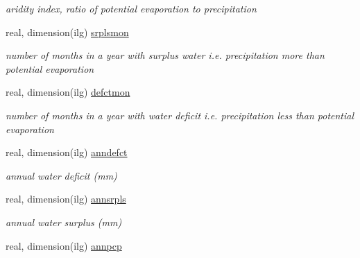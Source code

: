 \begin{DoxyCompactItemize}
\begin{DoxyCompactList}\small\item\em aridity index, ratio of potential evaporation to precipitation \end{DoxyCompactList}\item 
\hypertarget{structctem__statevars_1_1veg__gat_a1240848293f77458712ea3692a27a6d9}{}real, dimension(ilg) \hyperlink{structctem__statevars_1_1veg__gat_a1240848293f77458712ea3692a27a6d9}{srplsmon}\label{structctem__statevars_1_1veg__gat_a1240848293f77458712ea3692a27a6d9}

\begin{DoxyCompactList}\small\item\em number of months in a year with surplus water i.\+e. precipitation more than potential evaporation \end{DoxyCompactList}\item 
\hypertarget{structctem__statevars_1_1veg__gat_a36f851ca400c9b78f44b675d732a8160}{}real, dimension(ilg) \hyperlink{structctem__statevars_1_1veg__gat_a36f851ca400c9b78f44b675d732a8160}{defctmon}\label{structctem__statevars_1_1veg__gat_a36f851ca400c9b78f44b675d732a8160}

\begin{DoxyCompactList}\small\item\em number of months in a year with water deficit i.\+e. precipitation less than potential evaporation \end{DoxyCompactList}\item 
\hypertarget{structctem__statevars_1_1veg__gat_a1e53f6a1f8f9c68b1e164b30fe833c52}{}real, dimension(ilg) \hyperlink{structctem__statevars_1_1veg__gat_a1e53f6a1f8f9c68b1e164b30fe833c52}{anndefct}\label{structctem__statevars_1_1veg__gat_a1e53f6a1f8f9c68b1e164b30fe833c52}

\begin{DoxyCompactList}\small\item\em annual water deficit (mm) \end{DoxyCompactList}\item 
\hypertarget{structctem__statevars_1_1veg__gat_a78be85930a7e515681ccb43c1d83104c}{}real, dimension(ilg) \hyperlink{structctem__statevars_1_1veg__gat_a78be85930a7e515681ccb43c1d83104c}{annsrpls}\label{structctem__statevars_1_1veg__gat_a78be85930a7e515681ccb43c1d83104c}

\begin{DoxyCompactList}\small\item\em annual water surplus (mm) \end{DoxyCompactList}\item 
\hypertarget{structctem__statevars_1_1veg__gat_a62018a3cba11b41c6568416303b55165}{}real, dimension(ilg) \hyperlink{structctem__statevars_1_1veg__gat_a62018a3cba11b41c6568416303b55165}{annpcp}\label{structctem__statevars_1_1veg__gat_a62018a3cba11b41c6568416303b55165}


\end{DoxyCompactItemize}
